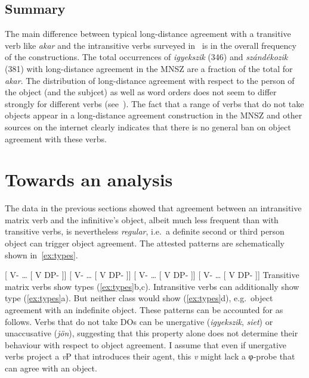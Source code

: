 \subsection{Summary}\label{sub:summary}

The main difference between typical long-distance agreement with a transitive
verb like \emph{akar} and the intransitive verbs surveyed in~ is
in the overall frequency of the constructions. The total occurrences of
\emph{igyekszik} (346) and \emph{szándékozik} (381) with long-distance
agreement in the \gls{MNSZ} are a fraction of the total for \emph{akar}. The
distribution of long-distance agreement with respect to the person of the
object (and the subjcet) as well as word orders does not seem to differ
strongly for different verbs
(see~).
%
The fact that a range of verbs that do not take \Acc{} objects appear in a
long-distance agreement construction in the \gls{MNSZ} and other sources on the
internet clearly indicates that there is no general ban on object agreement
with these verbs.

\section{Towards an analysis}\label{sec:analysis}

The data in the previous sections showed that agreement between an intransitive
matrix verb and the infinitive's object, albeit much less frequent than with
transitive verbs, is nevertheless \emph{regular}, i.e.\ a definite second or
third person object can trigger object agreement. The attested patterns are
schematically shown in~\eqref{ex:types}.

\pex\label{ex:types}
    \a 	{}[ V-\Sbj{} \dots{} [\tss{\Inf} V DP-\Def{} ]]\trailingcitation{\faCheck}
    \a 	{}[ V-\Obj{} \dots{} [\tss{\Inf} V DP-\Def{} ]]\trailingcitation{\faCheck}
    \a 	{}[ V-\Sbj{} \dots{} [\tss{\Inf} V DP-\Indef{} ]]\trailingcitation{\faCheck}
    \a 	{}[ V-\Obj{} \dots{} [\tss{\Inf} V DP-\Indef{} ]]\trailingcitation{\faTimes}
\xe
Transitive matrix verbs show types (\ref{ex:types}b,c). Intransitive verbs can
additionally show type (\ref{ex:types}a). But neither class would show
(\ref{ex:types}d), e.g.\ object agreement with an indefinite object.
%
These patterns can be accounted for as follows. Verbs that do not take \Acc{}
\glspl{DO} can be unergative (\emph{igyekszik}, \emph{siet}) or unaccusative
(\emph{jön}), suggesting that this property alone does not determine their
behaviour with respect to object agreement. I assume that even if unergative
verbs project a \emph{v}P that introduces their agent, this \emph{v} might lack
a φ-probe that can agree with an \Acc{} object.

